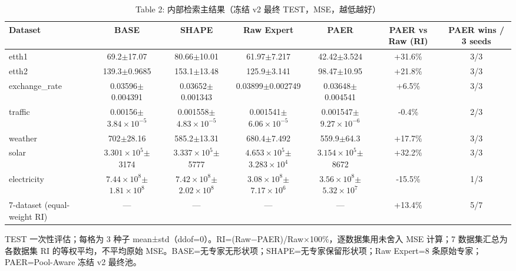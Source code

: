 \begin{table}[htbp]
  \centering
  \caption{Table 2: 内部检索主结果（冻结 v2 最终 TEST，MSE，越低越好）}
  \label{tab:main}
  \begin{tabular}{lcccccc}
    \toprule
    Dataset & BASE & SHAPE & Raw Expert & PAER & PAER vs Raw (RI) & PAER wins / 3 seeds \\
    \midrule
    etth1 & 69.2$\pm$17.07 & 80.66$\pm$10.01 & 61.97$\pm$7.217 & 42.42$\pm$3.524 & +31.6\% & 3/3 \\
    etth2 & 139.3$\pm$0.9685 & 153.1$\pm$13.48 & 125.9$\pm$3.141 & 98.47$\pm$10.95 & +21.8\% & 3/3 \\
    exchange\_rate & 0.03596$\pm$0.004391 & 0.03652$\pm$0.001343 & 0.03899$\pm$0.002749 & 0.03648$\pm$0.004541 & +6.5\% & 3/3 \\
    traffic & 0.00156$\pm$$3.84\times10^{-5}$ & 0.001558$\pm$$4.83\times10^{-5}$ & 0.001541$\pm$$6.06\times10^{-5}$ & 0.001547$\pm$$9.27\times10^{-6}$ & -0.4\% & 2/3 \\
    weather & 702$\pm$28.16 & 585.2$\pm$13.31 & 680.4$\pm$7.492 & 559.9$\pm$64.3 & +17.7\% & 3/3 \\
    solar & $3.301\times10^{5}$$\pm$3174 & $3.337\times10^{5}$$\pm$5777 & $4.653\times10^{5}$$\pm$$3.283\times10^{4}$ & $3.154\times10^{5}$$\pm$8672 & +32.2\% & 3/3 \\
    electricity & $7.44\times10^{8}$$\pm$$1.81\times10^{8}$ & $7.42\times10^{8}$$\pm$$2.02\times10^{8}$ & $3.08\times10^{8}$$\pm$$7.17\times10^{6}$ & $3.56\times10^{8}$$\pm$$5.32\times10^{7}$ & -15.5\% & 1/3 \\
    7-dataset (equal-weight RI) & — & — & — & — & +13.4\% & 5/7 \\
    \bottomrule
  \end{tabular}
  {\footnotesize TEST 一次性评估；每格为 3 种子 mean±std（ddof=0）。RI=(Raw−PAER)/Raw×100\%，逐数据集用未舍入 MSE 计算；7 数据集汇总为各数据集 RI 的等权平均，不平均原始 MSE。BASE=无专家无形状项；SHAPE=无专家保留形状项；Raw Expert=8 条原始专家；PAER=Pool-Aware 冻结 v2 最终池。}
\end{table}
